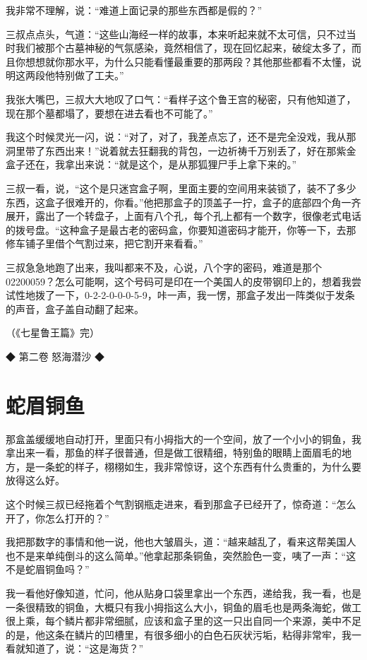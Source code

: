 我非常不理解，说：“难道上面记录的那些东西都是假的？”

三叔点点头，气道：“这些山海经一样的故事，本来听起来就不太可信，只不过当时我们被那个古墓神秘的气氛感染，竟然相信了，现在回忆起来，破绽太多了，而且你想想就你那水平，为什么只能看懂最重要的那两段？其他那些都看不太懂，说明这两段他特别做了工夫。”

我张大嘴巴，三叔大大地叹了口气：“看样子这个鲁王宫的秘密，只有他知道了，现在那个墓都塌了，要想在进去看也不可能了。”

我这个时候灵光一闪，说：“对了，对了，我差点忘了，还不是完全没戏，我从那洞里带了东西出来！”说着就去狂翻我的背包，一边祈祷千万别丢了，好在那紫金盒子还在，我拿出来说：“就是这个，是从那狐狸尸手上拿下来的。”

三叔一看，说，“这个是只迷宫盒子啊，里面主要的空间用来装锁了，装不了多少东西，这盒子很难开的，你看。”他把那盒子的顶盖子一拧，盒子的底部四个角一齐展开，露出了一个转盘子，上面有八个孔，每个孔上都有一个数字，很像老式电话的拨号盘。“这种盒子是最古老的密码盒，你要知道密码才能开，你等一下，去那修车铺子里借个气割过来，把它割开来看看。”

三叔急急地跑了出来，我叫都来不及，心说，八个字的密码，难道是那个02200059？怎么可能啊，这个号码可是印在一个美国人的皮带钢印上的，想着我尝试性地拨了一下，0-2-2-0-0-0-5-9，咔一声，我一愣，那盒子发出一阵类似于发条的声音，盒子盖自动翻了起来。

（《七星鲁王篇》完）

◆ 第二卷 怒海潜沙 ◆

\chapter{蛇眉铜鱼}

那盒盖缓缓地自动打开，里面只有小拇指大的一个空间，放了一个小小的铜鱼，我拿出来一看，那鱼的样子很普通，但是做工很精细，特别鱼的眼睛上面眉毛的地方，是一条蛇的样子，栩栩如生，我非常惊讶，这个东西有什么贵重的，为什么要放得这么好。

这个时候三叔已经拖着个气割钢瓶走进来，看到那盒子已经开了，惊奇道：“怎么开了，你怎么打开的？”

我把那数字的事情和他一说，他也大皱眉头，道：“越来越乱了，看来这帮美国人也不是来单纯倒斗的这么简单。”他拿起那条铜鱼，突然脸色一变，咦了一声：“这不是蛇眉铜鱼吗？”

我一看他好像知道，忙问，他从贴身口袋里拿出一个东西，递给我，我一看，也是一条很精致的铜鱼，大概只有我小拇指这么大小，铜鱼的眉毛也是两条海蛇，做工很上乘，每个鳞片都非常细腻，应该和盒子里的这一只出自同一个来源，美中不足的是，他这条在鳞片的凹槽里，有很多细小的白色石灰状污垢，粘得非常牢，我一看就知道了，说：“这是海货？”

